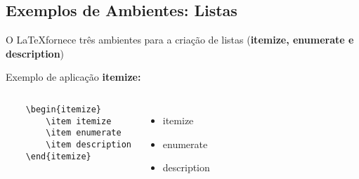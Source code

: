 \subsection*{Exemplos de Ambientes: Listas} %

\begin{frame}[fragile]
O \LaTeX fornece três ambientes para a criação de listas ({\bf itemize, enumerate e description})

Exemplo de aplicação {\bf itemize:}

\begin{columns}
\column[t]{6cm}
\begin{verbatim}
    \begin{itemize}
        \item itemize
        \item enumerate
        \item description
    \end{itemize}
\end{verbatim}
\column[t]{6cm}
\vspace{0.5cm}
\begin{itemize}
    \item itemize
    \item enumerate
    \item description
\end{itemize}
\end{columns}
\end{frame}



